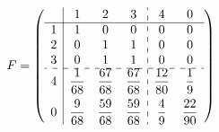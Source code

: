 \[
F =
\left(
\begin{array}{c|ccc:cc}
    & 1 & 2 & 3 & 4 & 0 \\\hline
  1 & 1              & 0              & 0              & 0              & 0              \\
  2 & 0              & 1              & 1              & 0              & 0              \\
  3 & 0              & 1              & 1              & 0              & 0              \\
  \hdashline
  4 & \dfrac{1}{68}  & \dfrac{67}{68} & \dfrac{67}{68} & \dfrac{12}{80} & \dfrac{1}{9}   \\[8pt]
  0 & \dfrac{9}{68}  & \dfrac{59}{68} & \dfrac{59}{68} & \dfrac{4}{9}   & \dfrac{22}{90} \\
\end{array}
\right)
\]
